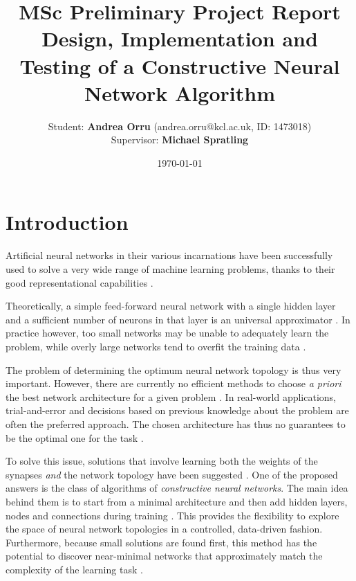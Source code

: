 \documentclass[a4paper,12pt]{article}
\begin{document}
\title{MSc Preliminary Project Report \\ \textbf{Design, Implementation and Testing of a Constructive Neural Network Algorithm}}
\author{Student: \textbf{Andrea Orru} (andrea.orru@kcl.ac.uk, ID: 1473018) \\ Supervisor: \textbf{Michael Spratling}}
\date{\today}
\maketitle

\section{Introduction}
	Artificial neural networks in their various incarnations have been successfully used to solve a very wide
	range of machine learning problems, thanks to their good representational capabilities \cite{sharma2010constructive}.
	
	Theoretically, a simple feed-forward neural network with a single hidden layer and a sufficient number of neurons in that layer is an universal approximator \cite{hornik1989multilayer}.
	In practice however, too small networks may be unable to adequately learn the problem, while overly large networks tend to overfit the training data \cite{parekh2000constructive}.
	
	The problem of determining the optimum neural network topology is thus very important. However, there are currently no efficient methods to choose \emph{a priori}
	the best network architecture for a given problem \cite{parekh2000constructive}.
	In real-world applications, trial-and-error and decisions based on previous knowledge about the problem are often the preferred approach. The chosen architecture
	has thus no guarantees to be the optimal one for the task \cite{parekh2000constructive}\cite{sharma2010constructive}.
	
	To solve this issue, solutions that involve learning both the weights of the synapses \emph{and} the network topology have been suggested \cite{parekh2000constructive}.
	One of the proposed answers is the class of algorithms of \emph{constructive neural networks}. The main idea behind them is to start from a minimal architecture and then add
	hidden layers, nodes and connections during training \cite{sharma2010constructive}.
	This provides the flexibility to explore the space of neural network topologies in a controlled, data-driven fashion.
	Furthermore, because small solutions are found first, this method has the potential to discover near-minimal networks that approximately match the complexity of the learning task \cite{parekh2000constructive}.
	
\end{document}

